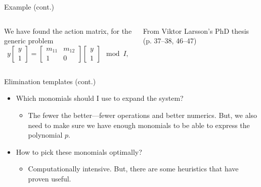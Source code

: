 \documentclass[aspectratio=169]{beamer}
\begin{document}
\begin{frame}[t]{Example (cont.)}
\vspace{1cm}
\begin{columns}
    \begin{column}{0.7\textwidth}
        We have found the action matrix, for the generic problem
        \begin{equation*}
            y\begin{bmatrix}
                y \\ 1
            \end{bmatrix}
            =
            \begin{bmatrix}
                m_{11} & m_{12} \\ 1 & 0
            \end{bmatrix}
            \begin{bmatrix}
                y \\ 1
            \end{bmatrix}
            {\mod I},
        \end{equation*}
    \end{column}%
    \begin{column}{0.3\textwidth}
        \centering
        

        \vspace{5mm}

        {\scriptsize From Viktor Larsson's PhD thesis (p. 37--38, 46--47)}
    \end{column}
\end{columns}
\end{frame}

\begin{frame}{Elimination templates (cont.)}
\begin{itemize}
\item Which monomials should I use to expand the system?
    \begin{itemize}
    \item The fewer the better---fewer operations and better numerics. But, we also need to make sure we have enough monomials to be able to express the polynomial $p$.
    \end{itemize}
\item How to pick these monomials optimally?
    \begin{itemize}
    \item Computationally intensive. But, there are some heuristics that have proven useful.
    \end{itemize}
\end{itemize}
\end{frame}
\end{document}
